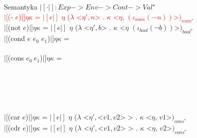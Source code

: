 \documentclass[12pt,serif]{beamer}
\begin{document}
\begin{frame}{Semantyka}
$|[ \cdot |]: Exp -> Env -> Cont -> Val^{\star}$ \newline
\\
\textcolor{red}{$|[$(- $e$)$|] \eta \kappa$ =
  $|[e|]$ $\eta$ ($\lambda$ <$\eta', n$> . $\kappa$ <$\eta$, $(\iota_{num} (-n))$>$)_{num^{*}}$} \\
$|[$(not $e$)$|] \eta \kappa$ =
  $|[e|]$ $\eta$ ($\lambda$ <$\eta', b$> . $\kappa$ <$\eta$ $(\iota_{bool} (\neg b))$>$)_{bool^{*}}$ \\
$|[$(cond $e$ $e_0$ $e_1$)$|] \eta \kappa$ = \\
 \newline
\\
$|[$(cons $e_0~e_1$)$|] \eta \kappa$ = \\
\hspace{1em}{$|[e_0|]$ $\eta$ ($\lambda$ <$\eta_0, v_0$> .} \\
\hspace{2em}{$|[e_1|]$ $\eta$ ($\lambda$ <$\eta_1, v_1$> .} \\
 \\
\hspace{2em}{)} \\
\hspace{1em}{)} \newline
\\
$|[$(car $e$)$|] \eta \kappa$ =
  $|[e|]$ $\eta$ ($\lambda$ <$\eta', $<$v1, v2$> > . $\kappa$ <$\eta$, $v1$>$)_{cons^{*}}$ \\
$|[$(cdr $e$)$|] \eta \kappa$ =
  $|[e|]$ $\eta$ ($\lambda$ <$\eta', $<$v1, v2$> > . $\kappa$ <$\eta$, $v2$>$)_{cons^{*}}$ \\
\end{frame}
\end{document}

